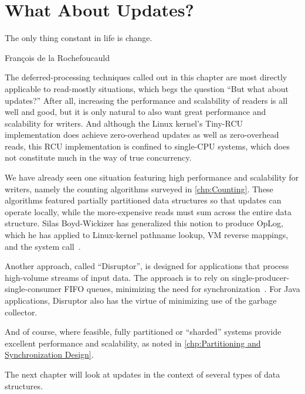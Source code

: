 
\section{What About Updates?}
\label{sec:defer:What About Updates?}
%
\epigraph{The only thing constant in life is change.}
	 {Fran\c{c}ois de la Rochefoucauld}

The deferred-processing techniques called out in this chapter are most
directly applicable to read-mostly situations, which begs the question
``But what about updates?''
After all, increasing the performance and scalability of readers is all
well and good, but it is only natural to also want great performance and
scalability for writers.
And although the Linux kernel's Tiny-RCU implementation does achieve
zero-overhead updates as well as zero-overhead reads, this RCU
implementation is confined to single-CPU systems, which does not
constitute much in the way of true concurrency.

We have already seen one situation featuring high performance and
scalability for writers, namely the counting algorithms surveyed in
\cref{chp:Counting}.
These algorithms featured partially partitioned data structures so
that updates can operate locally, while the more-expensive reads
must sum across the entire data structure.
Silas Boyd-Wickizer has generalized this notion to produce
OpLog, which he has applied to
Linux-kernel pathname lookup, VM reverse mappings, and the  system
call~\cite{SilasBoydWickizerPhD}.

Another approach, called ``Disruptor'', is designed for applications
that process high-volume streams of input data.
The approach is to rely on single-producer-single-consumer FIFO queues,
minimizing the need for synchronization~\cite{AdrianSutton2013LCA:Disruptor}.
For Java applications, Disruptor also has the virtue of minimizing use
of the garbage collector.

And of course, where feasible, fully partitioned or ``sharded'' systems
provide excellent performance and scalability, as noted in
\cref{chp:Partitioning and Synchronization Design}.

The next chapter will look at updates in the context of several types
of data structures.
